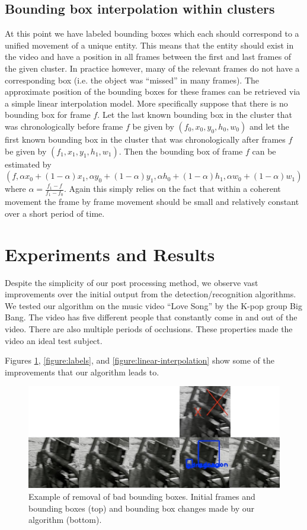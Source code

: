 \documentclass{article}
\begin{document}
\subsection{Bounding box interpolation within clusters}

At this point we have labeled bounding boxes which each should correspond to a unified movement of a unique entity. This means that the entity should exist in the video and have a position in all frames between
the first and last frames of the given cluster. In practice however, many of the relevant frames do not have a corresponding box (i.e. the object was ``missed'' in many frames). The approximate position of the
bounding boxes for these frames can be retrieved via a simple linear interpolation model. More specifically suppose that there is no bounding box for frame $f$. Let the last known bounding box in the cluster 
that was chronologically before frame $f$ be given by $(f_0, x_0, y_0, h_0, w_0)$ and let the first known bounding box in the cluster that was chronologically after frames $f$ be given by 
$(f_1, x_1, y_1, h_1, w_1)$. Then the bounding box of frame $f$ can be estimated by $(f, \alpha x_0 + (1-\alpha)x_1, \alpha y_0 + (1-\alpha)y_1, \alpha h_0 + (1-\alpha)h_1, \alpha w_0 + (1-\alpha)w_1)$
where $\alpha = \frac{f_1-f}{f_1 - f_0}$. Again this simply relies on the fact that within a coherent movement the frame by frame movement should be small and relatively constant over a short period of time.

\section{Experiments and Results}
Despite the simplicity of our post processing method, we observe vast improvements over the initial output from the detection/recognition algorithms. We tested our algorithm on
the music video ``Love Song'' by the K-pop group Big Bang. The video has five different people that constantly come in and out of the video. 
There are also multiple periods of occlusions. These properties made the 
video an ideal test subject. 

Figures \ref{figure:denoise}, \ref{figure:labels}, and \ref{figure:linear-interpolation} show some of the improvements that our algorithm leads to. 

\begin{figure}[!t]
\centering
\includegraphics[width=\linewidth]{denoise.jpg}
\caption{Example of removal of bad bounding boxes. Initial frames and bounding boxes (top) and bounding box changes made by our algorithm (bottom). }
\label{figure:denoise}
\end{figure}
\end{document}
